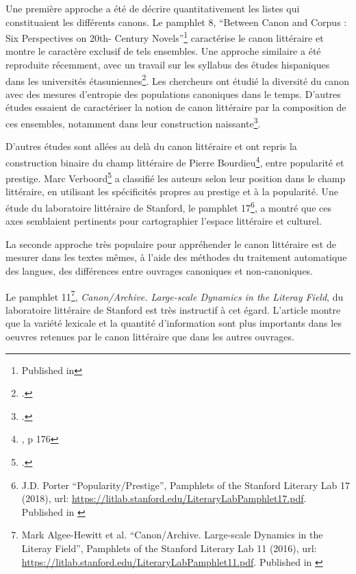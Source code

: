Une première approche a été de décrire quantitativement les listes qui constituaient les différents canons. Le pamphlet 8, \enquote{Between Canon and Corpus : Six Perspectives on 20th- Century
Novels}\footnote{\cite{algee-hewitt_between_2015} Published in\cite{moretti_canonarchive_2017}} caractérise le canon littéraire et montre le caractère exclusif de tels ensembles. Une approche similaire a été reproduite récemment, avec un travail sur les syllabus des études hispaniques dans les universités étasuniennes\footcites{gonzalez_measuring_2021}. Les chercheurs ont étudié la diversité du canon avec des mesures d'entropie des populations canoniques dans le temps. D'autres études essaient de caractériser la notion de canon littéraire par la composition de ces ensembles, notamment dans leur construction naissante\footcites{baird_examining_2021}.

D'autres études sont allées au delà du canon littéraire et ont repris la construction binaire du champ littéraire de Pierre Bourdieu\footnote{\cite{bourdieu_les_1992}, p 176}, entre popularité et prestige. Marc Verboord\footcites{verboord_classification_2003} a classifié les auteurs selon leur position dans le champ littéraire, en utilisant les spécificités propres au prestige et à la popularité. Une étude du laboratoire littéraire de Stanford, le pamphlet 17\footnote{J.D. Porter \enquote{Popularity/Prestige}, Pamphlets of the Stanford Literary Lab 17 (2018), url: \url{https://litlab.stanford.edu/LiteraryLabPamphlet17.pdf}. Published in \cite{moretti_canonarchive_2017}}, a montré que ces axes semblaient pertinents pour cartographier l'espace littéraire et culturel.

La seconde approche très populaire pour appréhender le canon littéraire est de mesurer dans les textes mêmes, à l'aide des méthodes du traitement automatique des langues, des différences entre ouvrages canoniques et non-canoniques. 

Le pamphlet 11\footnote{Mark Algee-Hewitt et al. \enquote{Canon/Archive. Large-scale Dynamics in the Literay Field}, Pamphlets of the Stanford Literary Lab 11 (2016), url: \url{https://litlab.stanford.edu/LiteraryLabPamphlet11.pdf}. Published in \cite{moretti_canonarchive_2017}}, \textit{Canon/Archive. Large-scale Dynamics in the Literay Field}, du laboratoire littéraire de Stanford est très instructif à cet égard. L'article montre que la variété lexicale et la quantité d'information sont plus importants dans les oeuvres retenues par le canon littéraire que dans les autres ouvrages. 

